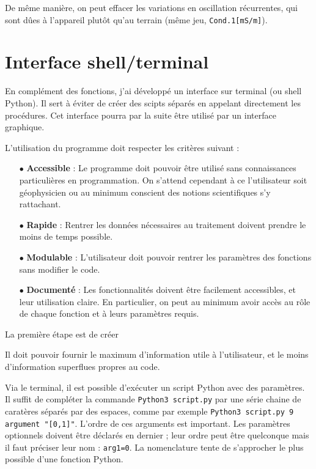 \documentclass[12pt]{article}
\begin{document}
    De même manière, on peut effacer les variations en oscillation récurrentes, qui sont dûes à l'appareil plutôt qu'au terrain (même jeu, \texttt{Cond.1[mS/m]}).

\newpage
\section{Interface shell/terminal}

    En complément des fonctions, j'ai développé un interface sur terminal (ou shell Python). Il sert à éviter de créer des scipts séparés en appelant directement les procédures. Cet interface pourra par la suite être utilisé par un interface graphique.
    
    L'utilisation du programme doit respecter les critères suivant :
    \begin{enumerate}
        \item[$\bullet$] \textbf{Accessible} : Le programme doit pouvoir être utilisé sans connaissances particulières en programmation. On s'attend cependant à ce l'utilisateur soit géophysicien ou au minimum conscient des notions scientifiques  s'y rattachant.
        \item[$\bullet$] \textbf{Rapide} : Rentrer les données nécessaires au traitement doivent prendre le moins de temps possible.
        \item[$\bullet$] \textbf{Modulable} : L'utilisateur doit pouvoir rentrer les paramètres des fonctions sans modifier le code.
        \item[$\bullet$] \textbf{Documenté} : Les fonctionnalités doivent être facilement accessibles, et leur utilisation claire. En particulier, on peut au minimum avoir accès au rôle de chaque fonction et à leurs paramètres requis.
    \end{enumerate}

    La première étape est de créer 

    Il doit pouvoir fournir le maximum d'information utile à l'utilisateur, et le moins d'information superflues propres au code.

    Via le terminal, il est possible d'exécuter un script Python avec des paramètres. Il suffit de compléter la commande \texttt{Python3 script.py} par une série chaine de caratères séparés par des espaces, comme par exemple \texttt{Python3 script.py 9 argument "[0,1]"}. L'ordre de ces arguments est important. Les paramètres optionnels doivent être déclarés en dernier ; leur ordre peut être quelconque mais il faut préciser leur nom : \texttt{arg1=0}. La nomenclature tente de s'approcher le plus possible d'une fonction Python.
\end{document}
